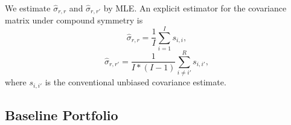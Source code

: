 \documentclass[3p,times,twocolumn]{elsarticle}
\begin{document}
We estimate $\widehat{\sigma}_{r,r}$ and $\widehat{\sigma}_{r,r'}$ by MLE.
An explicit estimator for the covariance matrix under compound symmetry \citep[see][p. 95]{seberMultivariateObservations1984} is
\begin{equation}
    \widehat{\sigma}_{r,r}=\dfrac{1}{I}\sum_{i=1}^{I}s_{i,i},
\end{equation}
\begin{equation}
    \widehat{\sigma}_{r,r'}=\dfrac{1}{I*(I-1)}\sum_{i\neq i'}^{R}s_{i,i'},
\end{equation}
where $s_{i,i'}$ is the conventional unbiased covariance estimate.

\subsection{Baseline Portfolio}\label{appendix:baseline_portfolio}
\end{document}
